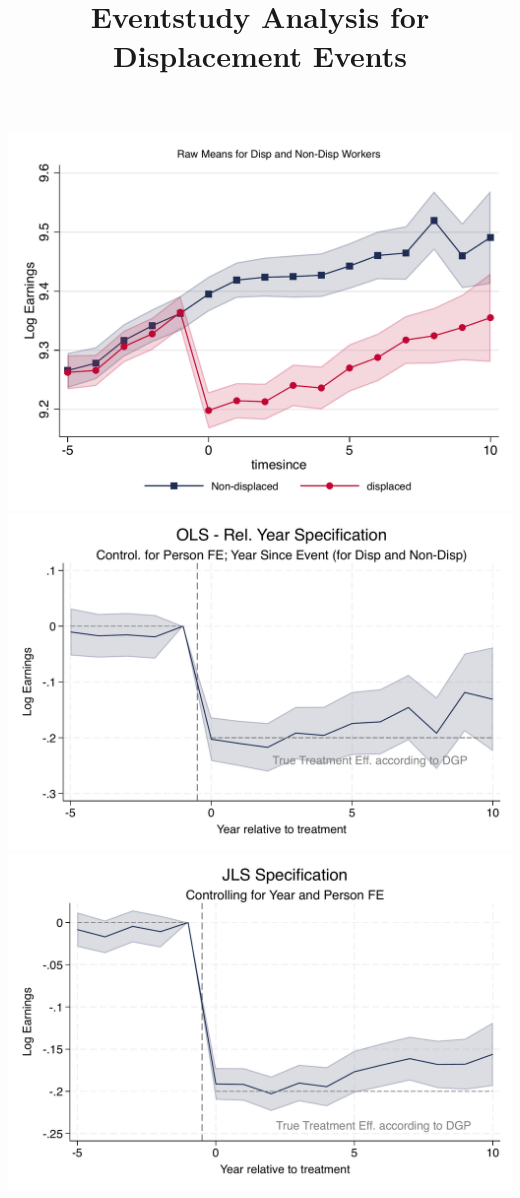 \documentclass{article}
\begin{document}
\title{Eventstudy Analysis for Displacement Events}
\maketitle
\includegraphics[width = .9\textwidth]{Eventstudy/eventstudy_RawMeans.pdf} \\ 
\includegraphics[width = .9\textwidth]{Eventstudy/eventstudy_OLS.pdf} \\ 
\includegraphics[width = .9\textwidth]{Eventstudy/eventstudy_FE_JLS.pdf} \\ 
\end{document}
